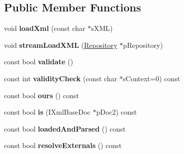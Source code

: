 \subsection*{\-Public \-Member \-Functions}
\begin{DoxyCompactItemize}
\item 
\hypertarget{classgeneral__server_1_1LibXmlBaseDoc_a9b7a8a8471288f79f7fe4d30465e084d}{void {\bfseries load\-Xml} (const char $\ast$s\-X\-M\-L)}\label{classgeneral__server_1_1LibXmlBaseDoc_a9b7a8a8471288f79f7fe4d30465e084d}

\item 
\hypertarget{classgeneral__server_1_1LibXmlBaseDoc_a30b02de6de6ac1f09a7378c3bbe5c1e5}{void {\bfseries stream\-Load\-X\-M\-L} (\hyperlink{classgeneral__server_1_1Repository}{\-Repository} $\ast$p\-Repository)}\label{classgeneral__server_1_1LibXmlBaseDoc_a30b02de6de6ac1f09a7378c3bbe5c1e5}

\item 
\hypertarget{classgeneral__server_1_1LibXmlBaseDoc_a4ad77bd86cfa045994448dbe50396cab}{const bool {\bfseries validate} ()}\label{classgeneral__server_1_1LibXmlBaseDoc_a4ad77bd86cfa045994448dbe50396cab}

\item 
\hypertarget{classgeneral__server_1_1LibXmlBaseDoc_ada0eb0958af9bb482de5ab17c0e0fb74}{const int {\bfseries validity\-Check} (const char $\ast$s\-Context=0) const }\label{classgeneral__server_1_1LibXmlBaseDoc_ada0eb0958af9bb482de5ab17c0e0fb74}

\item 
\hypertarget{classgeneral__server_1_1LibXmlBaseDoc_adc5444e399fd07c93a0ac0c39ca653b6}{const bool {\bfseries ours} () const }\label{classgeneral__server_1_1LibXmlBaseDoc_adc5444e399fd07c93a0ac0c39ca653b6}

\item 
\hypertarget{classgeneral__server_1_1LibXmlBaseDoc_a7c8356e7a8cc1b92c395e27188d9eb65}{const bool {\bfseries is} (\-I\-Xml\-Base\-Doc $\ast$p\-Doc2) const }\label{classgeneral__server_1_1LibXmlBaseDoc_a7c8356e7a8cc1b92c395e27188d9eb65}

\item 
\hypertarget{classgeneral__server_1_1LibXmlBaseDoc_a3df89a65843d7a0a16bf48b99d01522d}{const bool {\bfseries loaded\-And\-Parsed} () const }\label{classgeneral__server_1_1LibXmlBaseDoc_a3df89a65843d7a0a16bf48b99d01522d}

\item 
\hypertarget{classgeneral__server_1_1LibXmlBaseDoc_a75fe98c406b6c37a4a55218a7ecb1a1a}{const bool {\bfseries resolve\-Externals} () const }\label{classgeneral__server_1_1LibXmlBaseDoc_a75fe98c406b6c37a4a55218a7ecb1a1a}


\end{DoxyCompactItemize}
